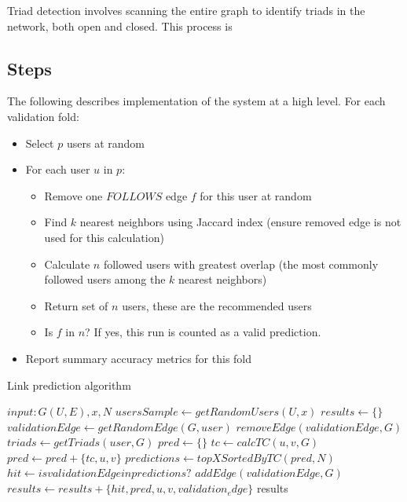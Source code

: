 %
%    


Triad detection involves scanning the entire graph to identify triads in the network, both open and closed. This process is 
\subsection{Steps}
The following describes implementation of the system at a high level. For each validation fold:

\begin{itemize}
\item Select $p$ users at random
\item For each user $u$ in $p$:
	\begin{itemize}
	\item Remove one $FOLLOWS$ edge $f$ for this user at random
	\item Find $k$ nearest neighbors using Jaccard index (ensure removed edge is not used for this calculation)
	\item Calculate $n$ followed users with greatest overlap (the most commonly followed users among the $k$ nearest neighbors)
	\item Return set of $n$ users, these are the recommended users
	\item Is $f$ in $n$? If yes, this run is counted as a valid prediction.
	\end{itemize}
\item Report summary accuracy metrics for this fold
\end{itemize}



\begin{algorithm}
\caption{Link prediction algorithm}\label{algo_tc}
\begin{algorithmic}[1]
\State $input: G(U, E), x, N$ 
\State $usersSample \gets getRandomUsers(U,x)$
\State $results \gets \{\}$
	\State $validationEdge \gets getRandomEdge(G, user)$
	\State $removeEdge(validationEdge,G)$
	\State $triads \gets getTriads(user, G)$
	\State $pred \gets \{\}$
		\State $tc \gets calcTC(u,v,G)$
		\State $pred \gets pred + \{tc, u, v\}$
	\EndFor
	\State $predictions \gets topXSortedByTC(pred, N)$
	\State $hit \gets is validationEdge in predictions?$
	\State $addEdge(validationEdge, G)$
	\State $results \gets results + \{hit, pred, u, v, validation_edge\}$
\EndFor
\State \Return results
\end{algorithmic}
\end{algorithm}

